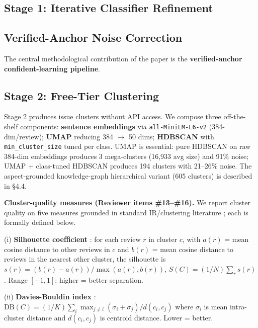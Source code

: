 \documentclass[sigconf, nonacm, anonymous, balance=false]{acmart}
\begin{document}
\subsection{Stage 1: Iterative Classifier Refinement}\label{stage-1-iterative-classifier-refinement}

\subsection{Verified-Anchor Noise Correction}\label{verified-anchor-noise-correction}

The central methodological contribution of the paper is the \textbf{verified-anchor confident-learning pipeline}.

\subsection{Stage 2: Free-Tier Clustering}\label{stage-2-free-tier-clustering}

Stage 2 produces issue clusters without API access. We compose three off-the-shelf components: \textbf{sentence embeddings} via \texttt{all-MiniLM-L6-v2} \cite{reimers2019sentencebert} (384-dim/review); \textbf{UMAP} \cite{mcinnes2018umap} reducing 384 $\to$ 50 dims; \textbf{HDBSCAN} \cite{mcinnes2017hdbscan} with \texttt{min\_cluster\_size} tuned per class. UMAP is essential: pure HDBSCAN on raw 384-dim embeddings produces 3 mega-clusters (16,933 avg size) and 91\% noise; UMAP + class-tuned HDBSCAN produces 194 clusters with 21--26\% noise. The aspect-grounded knowledge-graph hierarchical variant (605 clusters) is described in §4.4.

\textbf{Cluster-quality measures (Reviewer items \#13--\#16).} We report cluster quality on five measures grounded in standard IR/clustering literature \cite{manning2008introduction, steinbach2000comparison, strehl2002cluster}; each is formally defined below.

(i) \textbf{Silhouette coefficient} \cite{rousseeuw1987silhouettes}: for each review $r$ in cluster $c$, with $a(r)$ = mean cosine distance to other reviews in $c$ and $b(r)$ = mean cosine distance to reviews in the nearest other cluster, the silhouette is $s(r) = (b(r)-a(r))/\max(a(r),b(r))$, $S(C) = (1/N)\sum_r s(r)$. Range $[-1, 1]$; higher = better separation.

(ii) \textbf{Davies-Bouldin index} \cite{davies1979cluster}: $\mathrm{DB}(C) = (1/K)\sum_i \max_{j\neq i} (\sigma_i + \sigma_j) / d(c_i, c_j)$ where $\sigma_i$ is mean intra-cluster distance and $d(c_i, c_j)$ is centroid distance. Lower = better.
\end{document}
